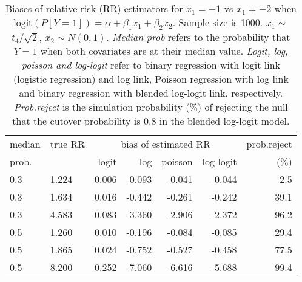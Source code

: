 \documentclass[12pt,a4paper]{article}
\begin{document}
\begin{table}[H] 
\small\sf\centering 
\caption{Biases of relative risk (RR) estimators for $x_1=-1$ vs $x_1=-2$ when $\mbox{logit}(P[Y=1])=\alpha+\beta_1 x_1 + \beta_2 x_2$. Sample size is 1000. $x_1 \sim $$t_4/\sqrt{2}$, $x_2 \sim N(0,1)$. {\it Median prob} refers to the probability that $Y=1$ when both covariates are at their median value. {\it Logit, log, poisson and log-logit} refer to binary regression with logit link (logistic regression) and log link, Poisson regression with log link and binary regression with blended log-logit link, respectively. {\it Prob.reject} is the simulation probability (\%) of rejecting the null that the cutover probability is $0.8$ in the blended log-logit model.} 
\begin{tabular}{llrrrrr} 
\toprule 
median & true RR & \multicolumn{4}{c}{bias of estimated RR} & prob.reject \\ 
prob. & & logit & log & poisson & log-logit  & (\%) \\ \midrule 
0.3 & 1.224 & 0.006 & -0.093 & -0.041 & -0.044 &  2.5 \\  
0.3 & 1.634 & 0.016 & -0.442 & -0.261 & -0.242 & 39.1 \\  
0.3 & 4.583 & 0.083 & -3.360 & -2.906 & -2.372 & 96.2 \\  
0.5 & 1.260 & 0.010 & -0.196 & -0.084 & -0.085 & 29.4 \\  
0.5 & 1.865 & 0.024 & -0.752 & -0.527 & -0.458 & 77.5 \\  
0.5 & 8.200 & 0.252 & -7.060 & -6.616 & -5.688 & 99.4 \\  
\bottomrule 
\end{tabular} 
\end{table} 
\end{document}
